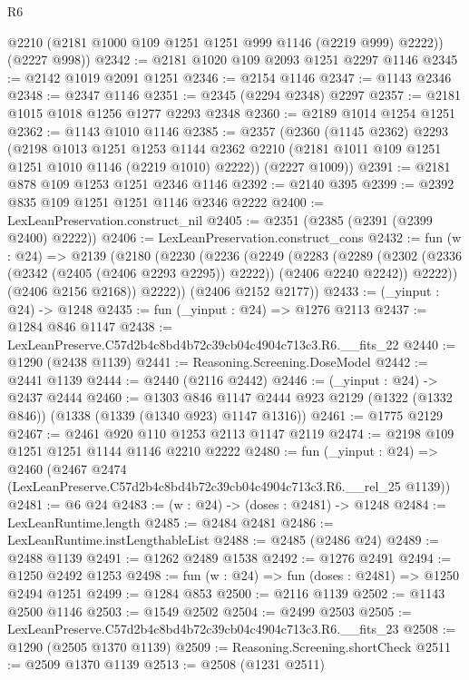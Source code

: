 \begin{lexlean}{R6}
\begin{coremodule}
        @2210
        (@2181 @1000 @109 @1251 @1251 @999 @1146 (@2219 @999) @2222))
      (@2227 @998))
@2342 := @2181 @1020 @109 @2093 @1251 @2297 @1146
@2345 := @2142 @1019 @2091 @1251
@2346 := @2154 @1146
@2347 := @1143 @2346
@2348 := @2347 @1146
@2351 := @2345 (@2294 @2348) @2297
@2357 := @2181 @1015 @1018 @1256 @1277 @2293 @2348
@2360 := @2189 @1014 @1254 @1251
@2362 := @1143 @1010 @1146
@2385 := @2357
    (@2360
      (@1145 @2362)
      @2293
      (@2198
        @1013
        @1251
        @1253
        @1144
        @2362
        @2210
        (@2181 @1011 @109 @1251 @1251 @1010 @1146 (@2219 @1010) @2222))
      (@2227 @1009))
@2391 := @2181 @878 @109 @1253 @1251 @2346 @1146
@2392 := @2140 @395
@2399 := @2392 @835 @109 @1251 @1251 @1146 @2346 @2222
@2400 := LexLeanPreservation.construct_nil
@2405 := @2351 (@2385 (@2391 (@2399 @2400) @2222))
@2406 := LexLeanPreservation.construct_cons
@2432 := fun (w : @24) =>
  @2139
    (@2180
      (@2230
        (@2236
          (@2249
            (@2283
              (@2289
                (@2302 (@2336 (@2342 (@2405 (@2406 @2293 @2295)) @2222)) (@2406 @2240 @2242))
                @2222))
            (@2406 @2156 @2168))
          @2222))
      (@2406 @2152 @2177))
@2433 := (_yinput : @24) -> @1248
@2435 := fun (_yinput : @24) => @1276 @2113
@2437 := @1284 @846 @1147
@2438 := LexLeanPreserve.C57d2b4c8bd4b72c39cb04c4904c713c3.R6.__fits_22
@2440 := @1290 (@2438 @1139)
@2441 := Reasoning.Screening.DoseModel
@2442 := @2441 @1139
@2444 := @2440 (@2116 @2442)
@2446 := (_yinput : @24) -> @2437 @2444
@2460 := @1303
    @846
    @1147
    @2444
    @923
    @2129
    (@1322 (@1332 @846))
    (@1338 (@1339 (@1340 @923) @1147 @1316))
@2461 := @1775 @2129
@2467 := @2461 @920 @110 @1253 @2113 @1147 @2119
@2474 := @2198 @109 @1251 @1251 @1144 @1146 @2210 @2222
@2480 := fun (_yinput : @24) =>
  @2460 (@2467 @2474 (LexLeanPreserve.C57d2b4c8bd4b72c39cb04c4904c713c3.R6.__rel_25 @1139))
@2481 := @6 @24
@2483 := (w : @24) -> (doses : @2481) -> @1248
@2484 := LexLeanRuntime.length
@2485 := @2484 @2481
@2486 := LexLeanRuntime.instLengthableList
@2488 := @2485 (@2486 @24)
@2489 := @2488 @1139
@2491 := @1262 @2489 @1538
@2492 := @1276 @2491
@2494 := @1250 @2492 @1253
@2498 := fun (w : @24) => fun (doses : @2481) => @1250 @2494 @1251
@2499 := @1284 @853
@2500 := @2116 @1139
@2502 := @1143 @2500 @1146
@2503 := @1549 @2502
@2504 := @2499 @2503
@2505 := LexLeanPreserve.C57d2b4c8bd4b72c39cb04c4904c713c3.R6.__fits_23
@2508 := @1290 (@2505 @1370 @1139)
@2509 := Reasoning.Screening.shortCheck
@2511 := @2509 @1370 @1139
@2513 := @2508 (@1231 @2511)

\end{coremodule}
\end{lexlean}
